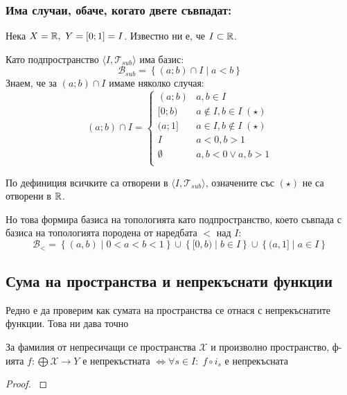 \subsubsection*{Има случаи, обаче, когато двете съвпадат:}
\begin{example}
    Нека $X = {\mathbb{R}},\ Y = [0; 1] = I$. Известно ни е, че $I \subset {\mathbb{R}}$.

    Като подпространство $\langle I, \mathcal T_{sub}\rangle$ има базис:
    \begin{equation}
        \mathcal B_{sub} = \left\{(a; b) \cap I\mid a < b\right\}
    \end{equation}
    Знаем, че за $(a; b) \cap I$ имаме няколко случая:
    \begin{equation}
        (a; b) \cap I = \begin{cases}
            (a; b)      & a, b \in I \\
            [0; b)      & a \notin I, b \in I\; (\star)\\
            (a; 1]      & a \in I, b \notin I\; (\star)\\
            I           & a < 0, b > 1 \\
            \emptyset   & a, b < 0 \lor a, b > 1 \\
        \end{cases}
    \end{equation}

    По дефиниция всичките са отворени в $\langle I, \mathcal T_{sub} \rangle$, означените със $(\star)$ не са отворени в ${\mathbb{R}}$. 
    
    Но това формира базиса на топологията като подпространство, което съвпада с базиса на топологията породена от наредбата $<$ над $I$:
    \begin{equation}
         \mathcal B_< = \left\{(a,b) \mid 0 < a < b < 1\right\} \cup \left\{ [0, b) \mid b \in I \right\} \cup \left\{ (a, 1] \mid a \in I \right\}
    \end{equation}
\end{example}

\subsection{Сума на пространства и непрекъснати функции}
Редно е да проверим как сумата на пространства се отнася с непрекъснатите функции. Това ни дава точно 
\begin{theorem}
    За фамилия от непресичащи се пространства $\mathcal X$ и произволно пространство, ф-ията $f : \bigoplus \mathcal X \to Y$ е непрекъстната $\iff \forall s \in I:\; f \circ  i_s$ е непрекъсната
\end{theorem}
\begin{proof}
    \cite[p.~75]{engelking1989general}
\end{proof}

